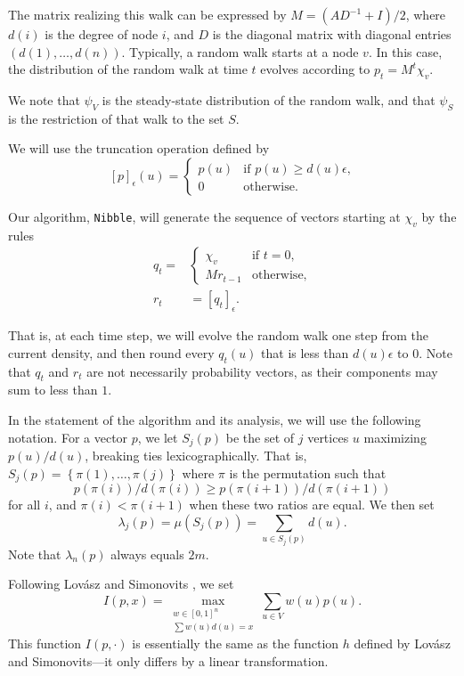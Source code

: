 \documentclass[11pt]{article}
\newcommand{\setj}[2]{S_{#1} (#2)}
\newcommand{\lamj}[2]{\lambda_{#1} (#2)}
\def\round#1{\left[#1 \right]_{\epsilon }}
\def\setof#1{\left\{#1  \right\}}
\def\setof#1{\left\{#1  \right\}}
\def\vol#1{\mu \left(#1  \right)}
\begin{document}
The matrix realizing this walk can be expressed by
 $M = (A D^{-1} + I) / 2$,
  where
  $d (i)$ is the degree of node $i$,
  and $D$ is the diagonal matrix with diagonal entries
  $(d (1), \dotsc , d (n))$.
Typically, a random walk starts at a node $v$.
In this case, the distribution of the random walk at time $t$
  evolves according to $p_{t} = M^{t} \chi_{v}$.

We note that $\psi _{V}$ is the steady-state distribution of the
  random walk, and that $\psi _{S}$ is the restriction
  of that walk to the set $S$.




We will use the truncation operation defined by
\[
  \round{p} (u)
=
\begin{cases}
  p (u) & \text{if $p (u) \geq  d(u) \epsilon$,}\\
  0 & \text{otherwise}.
\end{cases}
\]


Our algorithm, \texttt{Nibble}, will generate the sequence of
  vectors starting at $\chi_{v}$ by the rules
\begin{align}
q_{t} = &
  \begin{cases}
\chi_{v} & \text{if $t = 0$, }
\\
 M r_{t-1}  & \text{otherwise,}
\end{cases}
\label{eqn:qt}
\\
r_{t} & = \round{q_{t}}.
\label{eqn:rt}
\end{align}


That is, at each time step, we will evolve the random walk one
  step from the current density, and then round every $q_{t} (u)$
  that is less than $d (u) \epsilon$ to 0.
Note that $q_{t}$ and $r_{t}$ are not necessarily probability vectors,
  as their components may sum to less than $1$.

In the statement of the algorithm and its analysis, we will use the
  following notation.
For a vector $p$, we let $\setj{j}{p}$ be the set of $j$ vertices $u$
  maximizing $p (u) / d (u)$, breaking ties lexicographically.
That is, $\setj{j}{p} = \setof{\pi (1), \dotsc , \pi (j)}$
  where $\pi$  is the permutation  such that
\[
p (\pi (i)) / d (\pi (i)) \geq p (\pi (i+1)) / d (\pi (i+1))
\]
  for all $i$,
  and $\pi (i) < \pi (i+1)$ when these two ratios are equal.
We then set
\[
  \lamj{j}{p} = \vol{S_{j} (p)} = \sum_{u \in \setj{j}{p}} d (u).
\]
Note that $\lamj{n}{p}$ always equals $2m$.

Following Lov\'asz and Simonovits \cite{LovaszSimonovitsFOCS}, we set
\begin{equation}\label{eqn:I}
  I (p, x) =
  \max_{\substack{w \in [0,1]^{n} \\
       \sum w (u) d (u) = x}}
  \sum_{u \in V} w (u) p (u) .
\end{equation}
This function $I (p,\cdot)$ is essentially the same as the function $h$
  defined by Lov\'asz and Simonovits---it only differs by a linear transformation.
\end{document}

